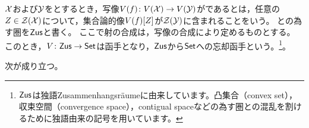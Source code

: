 \begin{definition}
    \( \ConnectivitySpace \)および\( \ConnectivitySpace<Y> \)を\WordConnectivitySpace とするとき，写像\( \FunctionStyle{\VFunctor(\Map)}{\VFunctor(\ConnectivitySpace)}{\VFunctor(\ConnectivitySpace<Y>)} \)が\WordConnectivityMorphism であるとは，任意の\( \Set<Z> \in \ConnectivityStructure(\ConnectivitySpace) \)について，集合論的像\( \VFunctor(\Map)[\Set<Z>] \)が\( \ConnectivityStructure(\ConnectivitySpace<Y>) \)に含まれることをいう。
    \WordConnectivitySpace と\WordConnectivityMorphism の為す圏を\( \mathsf{Zus} \)と書く。
    ここで射の合成は，写像の合成により定めるものとする。
    このとき，\( \FunctionStyle{\VFunctor}{\ZusCat}{\SetCat} \)は函手となり，\( \mathsf{Zus} \)から\( \mathsf{Set} \)への忘却函手という。\footnote{\(\mathsf{Zus}\)は独語Zusammenhangsr\"{a}umeに由来しています。凸集合（convex set），収束空間（convergence space），contigual spaceなどの為す圏との混乱を割けるために独語由来の記号を用いています。}。
\end{definition}

\begin{theorem}
    次が成り立つ。
\end{theorem}

